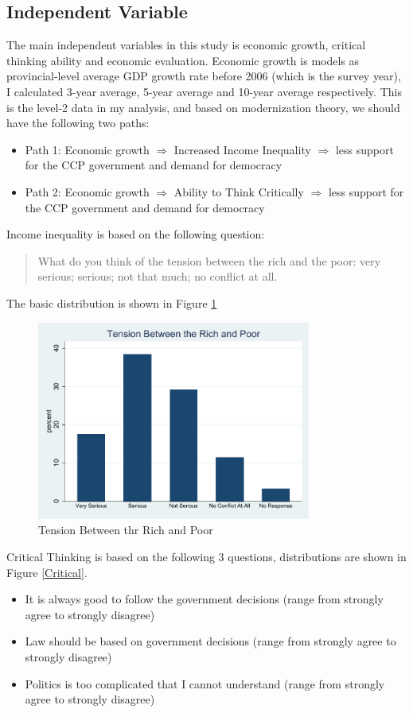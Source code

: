 \documentclass[12pt]{article}\usepackage[]{graphicx}\usepackage[]{color}
\begin{document}
\subsection{Independent Variable}
The main independent variables in this study is economic growth, critical thinking ability and economic evaluation. Economic growth is models as provincial-level average GDP growth rate before 2006 (which is the survey year), I calculated 3-year average, 5-year average and 10-year average respectively. This is the level-2 data in my analysis, and based on modernization theory, we should have the following two paths:
\begin{itemize}
\item	Path 1: Economic growth $\Rightarrow$ Increased Income Inequality $\Rightarrow$ less support for the CCP government and demand for democracy 
\item	Path 2: Economic growth $\Rightarrow$ Ability to Think Critically $\Rightarrow$ less support for the CCP government and demand for democracy 
\end{itemize}

\noindent Income inequality is based on the following question:
\begin{quotation}
	What do you think of the tension between the rich and the poor: very serious; serious; not that much; no conflict at all.
\end{quotation}
The basic distribution is shown in Figure \ref{rich}
\begin{figure}[H]
	\centering
	\includegraphics[width=90mm]{rich_poor}
	\caption{\label{rich} Tension Between thr Rich and Poor}
\end{figure}

Critical Thinking is based on the following 3 questions, distributions are shown in Figure \ref{Critical}.

\begin{itemize}
	\item It is always good to follow the government decisions (range from strongly agree to strongly disagree)
	\item Law should be based on government decisions (range from strongly agree to strongly disagree)
	\item Politics is too complicated that I cannot understand (range from strongly agree to strongly disagree)
\end{itemize}
\end{document}
